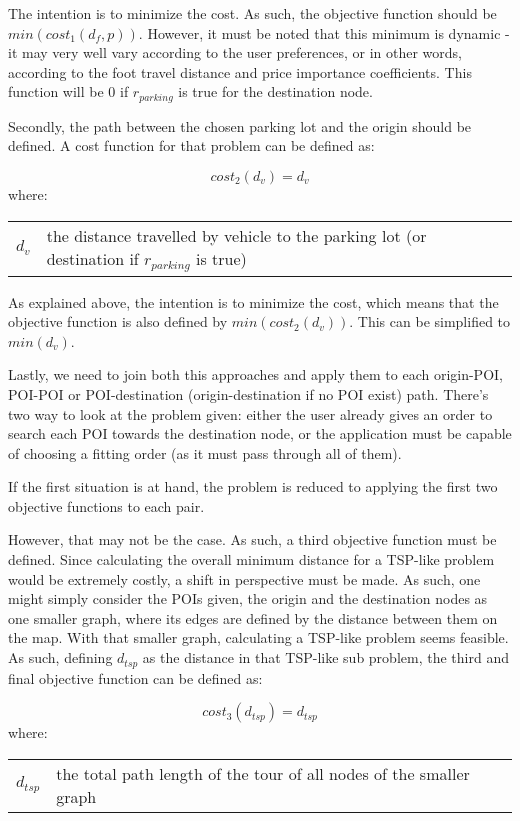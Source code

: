 \documentclass[a4paper, 12pt]{report}
\makeatletter
\newenvironment{conditions}
  {\par\vspace{\abovedisplayskip}\noindent\begin{tabular}{>{$}l<{$} @{${}={}$} l}}
  {\end{tabular}\par\vspace{\belowdisplayskip}}
\makeatother
\begin{document}
    The intention is to minimize the cost. As such, the objective function should be $min(cost_1(d_f, p))$. However, it must be noted that this minimum is dynamic - it may very well vary according to the user preferences, or in other words, according to the foot travel distance and price importance coefficients. This function will be 0 if $r_{parking}$ is true for the destination node.
    
    Secondly, the path between the chosen parking lot and the origin should be defined. A cost function for that problem can be defined as:
    
    \begin{equation}
        cost_2(d_v) = d_v
    \end{equation}
    where:
    \begin{conditions}
        d_v     &  the distance travelled by vehicle to the parking lot (or destination if $r_{parking}$ is true)\\
    \end{conditions}
    
    As explained above, the intention is to minimize the cost, which means that the objective function is also defined by $min(cost_2(d_v))$. This can be simplified to $min(d_v)$.
    
    Lastly, we need to join both this approaches and apply them to each origin-POI, POI-POI or POI-destination (origin-destination if no POI exist) path. There's two way to look at the problem given: either the user already gives an order to search each POI towards the destination node, or the application must be capable of choosing a fitting order (as it must pass through all of them).
    
    If the first situation is at hand, the problem is reduced to applying the first two objective functions to each pair. 
    
    However, that may not be the case. As such, a third objective function must be defined. Since calculating the overall minimum distance for a TSP-like problem would be extremely costly, a shift in perspective must be made. As such, one might simply consider the POIs given, the origin and the destination nodes as one smaller graph, where its edges are defined by the distance between them on the map. With that smaller graph, calculating a TSP-like problem seems feasible. As such, defining $d_{tsp}$ as the distance in that TSP-like sub problem, the third and final objective function can be defined as:
    
    \begin{equation}
        cost_3(d_{tsp}) = d_{tsp}
    \end{equation}
    where:
    \begin{conditions}
        d_{tsp}     &  the total path length of the tour of all nodes of the smaller graph \\
    \end{conditions}
    
\end{document}
